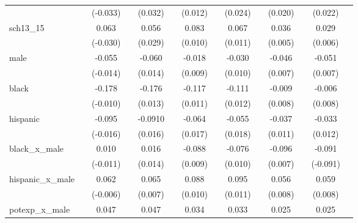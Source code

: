 \documentclass{article}
\begin{document}
\begin{landscape}
\begin{table}[ht]
\begin{tabular}{llclclclclclcl}
                       &  & (-0.033)       &     & (0.032)      &  & (0.012)        &      & (0.024)       &  & (0.020)        &     & (0.022)        &  \\
sch13\_15              &  & 0.063       &     & 0.056      &  & 0.083         &      & 0.067       &  & 0.036       &     & 0.029       &  \\
                       &  & (-0.030)       &     & (0.029)       &  & (0.010)        &      & (0.011)        &  & (0.005)        &     & (0.006)        &  \\
male                   &  & -0.055      &     & -0.060      &  & -0.018        &      & -0.030       &  & -0.046      &     & -0.051      &  \\
                       &  & (-0.014)       &     & (0.014)       &  & (0.009)        &      & (0.010)        &  & (0.007)        &     & (0.007)        &  \\
black                  &  & -0.178      &     & -0.176     &  & -0.117       &      & -0.111      &  & -0.009      &     & -0.006       &  \\
                       &  & (-0.010)       &     & (0.013)       &  & (0.011)        &      & (0.012)       &  & (0.008)       &     & (0.008)       &  \\
hispanic               &  & -0.095      &     & -0.0910     &  & -0.064       &      & -0.055      &  & -0.037      &     & -0.033      &  \\
                       &  & (-0.016)      &     & (0.016)      &  & (0.017)        &      & (0.018)        &  & (0.011)        &     & (0.012)        &  \\
black\_x\_male         &  & 0.010        &     & 0.016      &  & -0.088       &      & -0.076      &  & -0.096        &     & -0.091       &  \\
                       &  & (-0.011)       &     & (0.014)      &  & (0.009)         &      & (0.010)       &  & (0.007)        &     & (-0.091)      &  \\
hispanic\_x\_male      &  & 0.062       &     & 0.065       &  & 0.088        &      & 0.095       &  & 0.056       &     & 0.059        &  \\
                       &  & (-0.006)    &     & (0.007)       &  & (0.010)        &      & (0.011)       &  & (0.008)       &     & (0.008)       &  \\
potexp\_x\_male        &  & 0.047       &     & 0.047      &  & 0.034         &      & 0.033       &  & 0.025       &     & 0.025        &  \\

\end{tabular}
\end{table}
\end{landscape}
\end{document}
